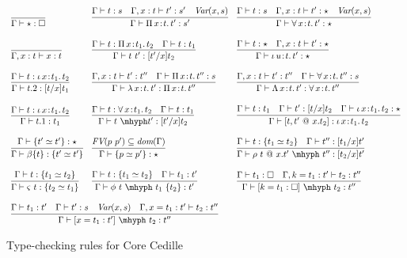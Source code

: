 \documentclass{article}
\newcommand{\abs}[4]{{#1}\, #2\! : \! #3.\, #4}
\begin{document}
\begin{figure}
  \[
  \begin{array}{lll}
    \infer{\Gamma\vdash \star : \Box}{\ } &
    \infer{\Gamma\vdash\abs{\Pi}{x}{t}{t'} : s'}{\Gamma \vdash t : s \quad \Gamma,x:t\vdash t' : s' \quad \textit{Var}(x,s)} &
    \infer{\Gamma\vdash\abs{\forall}{x}{t}{t'} : \star}{\Gamma \vdash t : s \quad \Gamma,x:t\vdash t' : \star \quad \textit{Var}(x,s)} 
    \\ \\
    \infer{\Gamma, x : t \vdash x : t}{\ } &
    \infer{\Gamma\vdash t\ t' : [t'/x]t_2}{\Gamma\vdash t : \abs{\Pi}{x}{t_1}{t_2} & \Gamma\vdash t : t_1} &
    \infer{\Gamma\vdash\abs{\iota}{u}{t}{t'} : \star}{\Gamma \vdash t : \star \quad \Gamma,x:t\vdash t' : \star} 
    \\ \\
    \infer{\Gamma\vdash t.2 : [t/x]t_1}{\Gamma\vdash t : \abs{\iota}{x}{t_1}{t_2}} &    
    \infer{\Gamma\vdash\abs{\lambda}{x}{t}{t'} : \abs{\Pi}{x}{t}{t''}}{\Gamma,x:t\vdash t':t'' \quad \Gamma \vdash \abs{\Pi}{x}{t}{t''} : s}  &
    \infer{\Gamma\vdash\abs{\Lambda}{x}{t}{t'} : \abs{\forall}{x}{t}{t''}}{\Gamma,x:t\vdash t':t'' \quad \Gamma \vdash \abs{\forall}{x}{t}{t''} : s} \\ \\
    \infer{\Gamma\vdash t.1 : t_1}{\Gamma\vdash t : \abs{\iota}{x}{t_1}{t_2}} &
    \infer{\Gamma\vdash t\ \mhyph t' : [t'/x]t_2}{\Gamma\vdash t : \abs{\forall}{x}{t_1}{t_2} & \Gamma\vdash t : t_1} &
    \infer{\Gamma\vdash [t,t'\ @\ x.t_2] : \abs{\iota}{x}{t_1}{t_2}}{\Gamma\vdash t : t_1 \quad \Gamma\vdash t' : [t/x]t_2 \quad \Gamma \vdash \abs{\iota}{x}{t_1}{t_2} : \star}
    \\ \\
    \infer{\Gamma\vdash \beta\{t\} : \{ t' \simeq t'\}}{\Gamma\vdash \{ t' \simeq t' \} : \star } &
    \infer{\Gamma\vdash \{ p \simeq p'\} : \star}{\textit{FV}(p\ p')\subseteq \textit{dom}(\Gamma)} &
    \infer{\Gamma\vdash \rho\ t\ @\ x.t'\ \mhyph\ t'' : [t_2/x]t'}{\Gamma \vdash t : \{ t_1 \simeq t_2 \} \quad \Gamma\vdash t'' : [t_1/x]t'}
    \\ \\
    \infer{\Gamma\vdash \varsigma\ t : \{ t_2 \simeq t_1\}}{\Gamma\vdash t : \{t_1 \simeq t_2\}} &
    \infer{\Gamma\vdash \phi\ t\ \mhyph\ t_1\ \{t_2\} : t'}{\Gamma \vdash t : \{t_1 \simeq t_2\} \quad \Gamma\vdash t_1 : t'} &
    \infer{\Gamma\vdash [ k = t_1 : \Box ]\ \mhyph\ t_2 : t''}{\Gamma\vdash t_1 : \Box \quad
                                                               \Gamma, k = t_1 : t' \vdash t_2 : t''} 
    \\ \\
    \multicolumn{2}{l}{
    \infer{\Gamma\vdash [ x = t_1 : t' ]\ \mhyph\ t_2 : t''}{\Gamma\vdash t_1 : t' \quad \Gamma \vdash t' : s \quad \textit{Var}(x,s) \quad
      \Gamma, x = t_1 : t' \vdash t_2 : t''} } &
    \     
  \end{array}
  \]
  \caption{Type-checking rules for Core Cedille}
  \label{fig:rules}
\end{figure}
\end{document}
